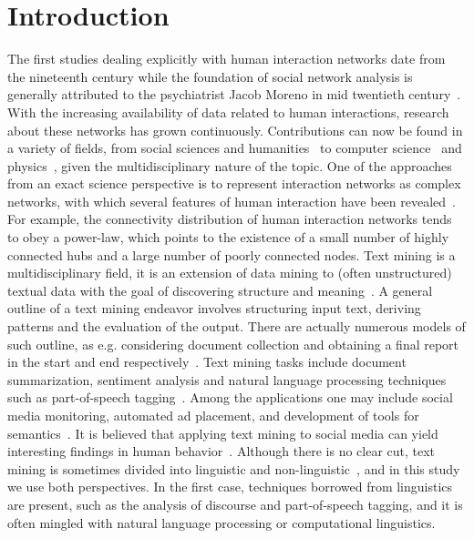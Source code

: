 \documentclass[review]{elsarticle}
\begin{document}
\linenumbers

\section{Introduction}
The first studies dealing explicitly with human interaction networks
date from the nineteenth century while the foundation of
social network analysis is generally attributed to the psychiatrist Jacob Moreno in mid twentieth century~\cite{moreno,newmanBook}.
With the increasing availability of data related to human interactions, research about these networks has grown continuously.
Contributions can now be found in a variety of fields, from social sciences and humanities~\cite{latour2013} to computer science~\cite{bird} and physics~\cite{barabasiHumanDyn,newmanFriendship}, given the multidisciplinary nature of the topic.
One of the approaches from an exact science perspective is to represent interaction networks as complex networks, with which 
several features of human interaction have been revealed~\cite{barabasiHumanDyn,newmanFriendship}.
For example, the connectivity distribution of human interaction networks tends to obey a power-law,
which points to the existence of a small number of highly connected hubs and a large number of poorly connected nodes.
Text mining is a multidisciplinary field,
it is an extension of data mining to (often unstructured) textual data
with the goal of discovering structure and meaning~\cite{customText}.
A general outline of a text mining endeavor involves structuring input text,
deriving patterns and the evaluation of the output.
There are actually numerous models of such outline,
as e.g. considering document collection and obtaining a final report in the
start and end respectively~\cite{textSurvey}.
Text mining tasks include document summarization, sentiment analysis
and natural language processing techniques such as part-of-speech tagging~\cite{nltk}.
Among the applications one may include social media monitoring, automated ad placement, and development of tools for 
semantics~\cite{textSurvey}.
It is believed that applying text mining to social media
can yield interesting findings in human behavior~\cite{customText}.
Although there is no clear cut, text mining is sometimes divided into linguistic and non-linguistic~\cite{customText},
and in this study we use both perspectives.
In the first case, techniques borrowed from linguistics are present, such as
the analysis of discourse and part-of-speech tagging,
and it is often mingled with natural language processing or computational linguistics.
\end{document}

